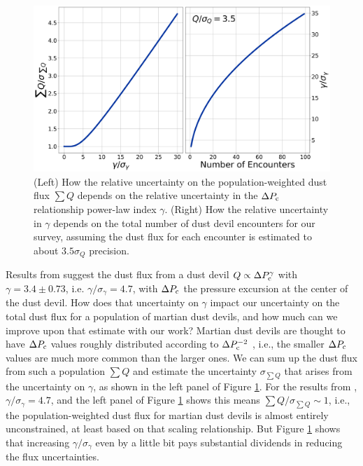 \begin{figure}
    \centering
    \includegraphics[width=\textwidth]{figures/Population_Weighted_Dust_Flux.png}
    \caption{(Left) How the relative uncertainty on the population-weighted dust flux $\sum Q$ depends on the relative uncertainty in the $\Delta P_{\rm c}$ relationship power-law index $\gamma$. (Right) How the relative uncertainty in $\gamma$ depends on the total number of dust devil encounters for our survey, assuming the dust flux for each encounter is estimated to about $3.5\sigma_Q$ precision.}
    \label{fig:Population_Weighted_Dust_Flux}
\end{figure}

Results from \cite{Neakreas2010} suggest the dust flux from a dust devil $Q \propto \Delta P_{\rm c}^\gamma$ with $\gamma = 3.4 \pm 0.73$, i.e. $\gamma/\sigma_\gamma = 4.7$, with $\Delta P_{\rm c}$ the pressure excursion at the center of the dust devil. How does that uncertainty on $\gamma$ impact our uncertainty on the total dust flux for a population of martian dust devils, and how much can we improve upon that estimate with our work? Martian dust devils are thought to have $\Delta P_{\rm c}$ values roughly distributed according to $\Delta P_{\rm c}^{-2}$ \cite{2016SSRv..203..277L}, i.e., the smaller $\Delta P_{\rm c}$ values are much more common than the larger ones. We can sum up the dust flux from such a population $\sum Q$ and estimate the uncertainty $\sigma_{\sum Q}$ that arises from the uncertainty on $\gamma$, as shown in the left panel of Figure \ref{fig:Population_Weighted_Dust_Flux}. For the results from \cite{Neakreas2010}, $\gamma/\sigma_\gamma = 4.7$, and the left panel of Figure \ref{fig:Population_Weighted_Dust_Flux} shows this means $\sum Q/\sigma_{\sum Q} \sim 1$, i.e., the population-weighted dust flux for martian dust devils is almost entirely unconstrained, at least based on that scaling relationship. But Figure \ref{fig:Population_Weighted_Dust_Flux} shows that increasing $\gamma/\sigma_\gamma$ even by a little bit pays substantial dividends in reducing the flux uncertainties. 


